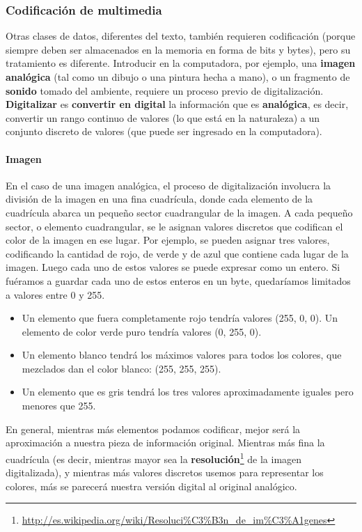 \documentclass[a4paper]{article}
\newcommand\liststyleLii{%
\renewcommand\labelitemi{{\textbullet}}
\renewcommand\labelitemii{${\circ}$}
\renewcommand\labelitemiii{${\blacksquare}$}
\renewcommand\labelitemiv{{\textbullet}}
}
\begin{document}
\subsubsection{Codificaci\'on de multimedia}
Otras clases de datos, diferentes del texto, tambi\'en requieren
codificaci\'on (porque siempre deben ser almacenados en la memoria en
forma de bits y bytes), pero su tratamiento es diferente. Introducir en
la computadora, por ejemplo, una \textbf{imagen anal\'ogica }(tal como
un dibujo o una pintura hecha a mano), o un fragmento de
\textbf{sonido} tomado del ambiente, requiere un proceso previo de
digitalizaci\'on. \textbf{Digitalizar} es \textbf{convertir en digital}
la informaci\'on que es \textbf{anal\'ogica}, es decir, convertir un
rango continuo de valores (lo que est\'a en la naturaleza) a un
conjunto discreto de valores (que puede ser ingresado en la
computadora).

\paragraph[Imagen ]{Imagen }
En el caso de una imagen anal\'ogica, el proceso de digitalizaci\'on
involucra la divisi\'on de la imagen en una fina cuadr\'icula, donde
cada elemento de la cuadr\'icula abarca un peque\~no sector
cuadrangular de la imagen. A cada peque\~no sector, o elemento
cuadrangular, se le asignan valores discretos que codifican el color de
la imagen en ese lugar. Por ejemplo, se pueden asignar tres valores,
codificando la cantidad de rojo, de verde y de azul que contiene cada
lugar de la imagen. Luego cada uno de estos valores se puede expresar
como un entero. Si fu\'eramos a guardar cada uno de estos enteros en un
byte, quedar\'iamos limitados a valores entre 0 y 255. 

\liststyleLii
\begin{itemize}
\item Un elemento que fuera completamente rojo tendr\'ia valores (255,
0, 0). Un elemento de color verde puro tendr\'ia valores (0, 255, 0). 
\item Un elemento blanco tendr\'a los m\'aximos valores para todos los
colores, que mezclados dan el color blanco: (255, 255, 255). 
\item Un elemento que es gris tendr\'a los tres valores aproximadamente
iguales pero menores que 255. 
\end{itemize}
En general, mientras m\'as elementos podamos codificar, mejor ser\'a la
aproximaci\'on a nuestra pieza de informaci\'on original. Mientras
m\'as fina la cuadr\'icula (es decir, mientras mayor sea la
\textbf{resoluci\'on}\footnote{\href{http://es.wikipedia.org/wiki/Resoluci?n_de_im?genes}{http://es.wikipedia.org/wiki/Resoluci\%C3\%B3n\_de\_im\%C3\%A1genes}}
de la imagen digitalizada), y mientras m\'as valores discretos usemos
para representar los colores, m\'as se parecer\'a nuestra versi\'on
digital al original anal\'ogico.
\end{document}
